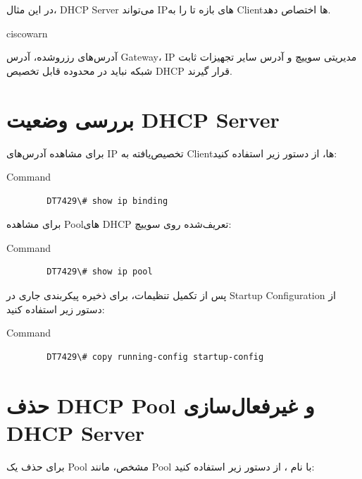 \documentclass[11pt,letterpaper]{report}
\newenvironment{tipbox}[1]{%
	\begin{noticebox}[title={\textbf{\faLightbulb\ #1}}]{ciscowarn}
	}{%
	\end{noticebox}
}
\begin{document}
	در این مثال، DHCP Server می‌تواند IPهای بازه
	 تا  را به Clientها اختصاص دهد.

	\begin{tipbox}{نکته}
		آدرس‌های رزروشده، آدرس Gateway، IP مدیریتی سوییچ و آدرس سایر
		تجهیزات ثابت شبکه نباید در محدوده قابل تخصیص DHCP قرار گیرند.
	\end{tipbox}


	\section{بررسی وضعیت DHCP Server}

	برای مشاهده آدرس‌های IP تخصیص‌یافته به Clientها، از دستور زیر استفاده
	کنید:

	\begin{latin}
		\begin{cliexample}{Command}
			\begin{verbatim}
		DT7429\# show ip binding
			\end{verbatim}
		\end{cliexample}
	\end{latin}

	برای مشاهده Poolهای DHCP تعریف‌شده روی سوییچ:

	\begin{latin}
		\begin{cliexample}{Command}
			\begin{verbatim}
		DT7429\# show ip pool
			\end{verbatim}
		\end{cliexample}
	\end{latin}

	پس از تکمیل تنظیمات، برای ذخیره پیکربندی جاری در Startup Configuration
	از دستور زیر استفاده کنید:

	\begin{latin}
		\begin{cliexample}{Command}
			\begin{verbatim}
		DT7429\# copy running-config startup-config
			\end{verbatim}
		\end{cliexample}
	\end{latin}


	\section{حذف DHCP Pool و غیرفعال‌سازی DHCP Server}

	برای حذف یک Pool مشخص، مانند Pool با نام ، از دستور
	زیر استفاده کنید:
\end{document}
